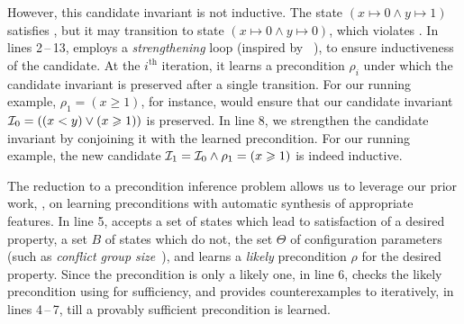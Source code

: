 \documentclass[conference]{IEEEtran}
\begin{document}
However, this candidate invariant is not inductive.
The state $(x \mapsto 0 \wedge y \mapsto 1)$ satisfies \Inv,
but it may transition to state $(x \mapsto 0 \wedge y \mapsto 0)$, which violates \Inv.
In lines 2\,--\,13, \Infer employs a \emph{strengthening} loop (inspired by ~\citep{Dillig2013InductiveIG}),
to ensure inductiveness of the candidate.
At the $i^\text{th}$ iteration, it learns a precondition $\rho_i$
under which the candidate invariant is preserved after a single transition.
For our running example, $\rho_1 = (x \geqslant 1)$, for instance,
would ensure that our candidate invariant $\mathcal{I}_0 = ((x < y) \vee (x \geqslant 1))$ is preserved.
In line 8, we strengthen the candidate invariant by conjoining it with the learned precondition.
For our running example, the new candidate $\mathcal{I}_1 = \mathcal{I}_0 \wedge \rho_1 = (x \geqslant 1)$ is indeed inductive.

The reduction to a precondition inference problem allows us to leverage our prior work, \PIE,
on learning preconditions with automatic synthesis of appropriate features.
In line 5, \PIE accepts a set \States of states which lead to satisfaction of a desired property,
a set $B$ of states which do not, the set $\Theta$ of configuration parameters
(such as \emph{conflict group size}~\citep{Padhi2016DatadrivenPI}),
and learns a \emph{likely} precondition $\rho$ for the desired property.
Since the precondition is only a likely one, in line 6, \Infer checks the likely precondition using \Checker for sufficiency,
and provides counterexamples to \PIE iteratively, in lines 4\,--\,7, till a provably sufficient precondition is learned.
\end{document}
